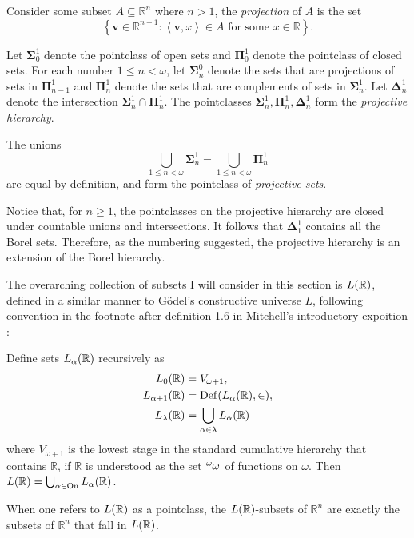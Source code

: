 \documentclass[12pt]{article}
\theoremstyle{plain}
\theoremstyle{definition}
\newcommand{\On}{\mathrm{On}}
\DeclareMathOperator{\Def}{Def}
\begin{document}
\begin{definition}
	Consider some subset $A \subseteq \mathbb{R}^n$ where $n > 1$, the \emph{projection} of $A$ is the set
	\[\left\{\mathbf{v} \in \mathbb{R}^{n - 1} : \text{$\left\langle \mathbf{v}, x \right\rangle \in A$ for some $x \in \mathbb{R}$}\right\}.\]

	Let $\boldsymbol\Sigma^1_0$ denote the pointclass of open sets and $\boldsymbol\Pi^1_0$ denote the pointclass of closed sets. For each number $1 \leq n < \omega$, let $\boldsymbol\Sigma^0_n$ denote the sets that are projections of sets in $\boldsymbol\Pi^1_{n - 1}$ and $\boldsymbol\Pi^1_n$ denote the sets that are complements of sets in $\boldsymbol\Sigma^1_n$. Let $\boldsymbol\Delta^1_n$ denote the intersection $\boldsymbol\Sigma^1_n \cap \boldsymbol\Pi^1_n$. The pointclasses $\boldsymbol\Sigma^1_n, \boldsymbol\Pi^1_n, \boldsymbol\Delta^1_n$ form the \emph{projective hierarchy}.

	The unions
	\[\bigcup_{1 \leq n < \omega} \boldsymbol\Sigma^1_n = \bigcup_{1 \leq n < \omega} \boldsymbol\Pi^1_n\]
	are equal by definition, and form the pointclass of \emph{projective sets}.
\end{definition}

Notice that, for $n \geq 1$, the pointclasses on the projective hierarchy are closed under countable unions and intersections. It follows that $\boldsymbol\Delta^1_1$ contains all the Borel sets. Therefore, as the numbering suggested, the projective hierarchy is an extension of the Borel hierarchy.

The overarching collection of subsets I will consider in this section is $L\mleft(\mathbb{R}\mright)$, defined in a similar manner to G\"odel's constructive universe $L$, following convention in the footnote after definition 1.6 in Mitchell's introductory expoition \cite{mitchell-inner-model-theory}:

\begin{definition}
	Define sets $L_\alpha\mleft(\mathbb{R}\mright)$ recursively as
	\begin{align*}
		L_0\mleft(\mathbb{R}\mright)            & = V_{\omega + 1},                                                \\
		L_{\alpha + 1}\mleft(\mathbb{R}\mright) & = \Def\mleft(L_\alpha\mleft(\mathbb{R}\mright), \in\mright),     \\
		L_\lambda\mleft(\mathbb{R}\mright)      & = \bigcup_{\alpha \in \lambda} L_\alpha\mleft(\mathbb{R}\mright)
	\end{align*}
	where $V_{\omega + 1}$ is the lowest stage in the standard cumulative hierarchy that contains $\mathbb{R}$, if $\mathbb{R}$ is understood as the set $\tensor[^\omega]{\omega}{}$ of functions on $\omega$. Then $L\mleft(\mathbb{R}\mright) = \bigcup_{\alpha \in \On} L_\alpha\mleft(\mathbb{R}\mright)$.

	When one refers to $L\mleft(\mathbb{R}\mright)$ as a pointclass, the $L\mleft(\mathbb{R}\mright)$-subsets of $\mathbb{R}^n$ are exactly the subsets of $\mathbb{R}^n$ that fall in $L\mleft(\mathbb{R}\mright)$.
\end{definition}
\end{document}
